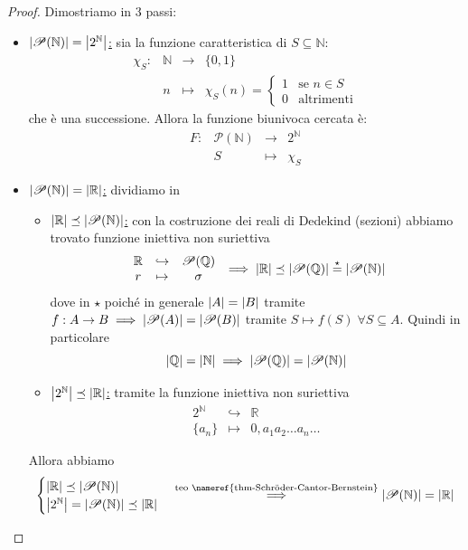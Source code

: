 \documentclass[a4paper,10pt]{article}
\theoremstyle{definition}
\newcommand{\na}{\mathbb{N}} %
\newcommand{\qu}{\mathbb{Q}} %
\newcommand{\re}{\mathbb{R}} %
\theoremstyle{indentdefinition}
\theoremstyle{indentpostulate}
\theoremstyle{indenttheorem}
\theoremstyle{myremark}
\theoremstyle{indentgeneral}
\begin{document}
\begin{proof}
    Dimostriamo in 3 passi:
    \begin{itemize}
        \item \underline{$\abs{\mathscr{P}(\na)}=\abs{ 2^\na}$:} sia la funzione caratteristica di $S\subseteq \na$:
        $$\begin{array}{cccc}
           \chi_S:  & \na & \to & \{0,1\} \\
             & n & \mapsto & \chi_S(n)=\begin{cases}
                 1 & \text{se }n\in S\\
                 0 & \text{altrimenti}
             \end{cases}
        \end{array}$$
        che è una successione. Allora la funzione biunivoca cercata è:
        $$\begin{array}{cccc}
           F:  & \mathscr{P}(\na) & \to & 2^\na \\
             & S & \mapsto & \chi_S
        \end{array}$$
        \item \underline{$\abs{\mathscr{P}(\na)}=\abs{ \re}$:} dividiamo in
        \begin{itemize}
        \item \underline{$\abs{\re}\preceq\abs{\mathscr{P}(\na)}$:} con la costruzione dei reali di Dedekind (sezioni) abbiamo trovato funzione iniettiva non suriettiva
        $$\begin{array}{ccc}
           \re & \hookrightarrow & \mathscr{P}(\qu)  \\
            r & \mapsto & \sigma
        \end{array}\implies \abs{\re}\preceq\abs{\mathscr{P}(\qu)}\overset{\star}{=}\abs{\mathscr{P}(\na)}$$
        dove in $\star$ poiché in generale $\abs{A}=\abs{B}$ tramite $f:A\to B\implies \abs{\mathscr{P}(A)}=\abs{\mathscr{P}(B)}$ tramite $S\mapsto f(S)\;\forall S\subseteq A$. Quindi in particolare
        $$\abs{\qu}=\abs{\na}\implies\abs{\mathscr{P}(\qu)}=\abs{\mathscr{P}(\na)}$$
        \item \underline{$\abs{ 2^\na}\preceq\abs{\re}$:} tramite la funzione iniettiva non suriettiva
        $$\begin{array}{ccc}
           2^\na & \hookrightarrow & \re  \\
            \{a_n\} & \mapsto & 0,a_1a_2\dots a_n\dots
        \end{array}$$
        \end{itemize}
        Allora abbiamo
        $$\begin{cases}
        \abs{\re}\preceq\abs{\mathscr{P}(\na)} \\
            \abs{ 2^\na}=\abs{\mathscr{P}(\na)}\preceq\abs{\re}
        \end{cases}\overset{\text{teo \nameref{thm-Schröder-Cantor-Bernstein}}}{\implies}\abs{\mathscr{P}(\na)}=\abs{ \re}$$
    \end{itemize}
\end{proof}
\end{document}
